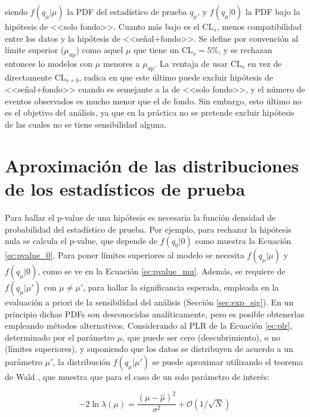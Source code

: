 \noindent
siendo $f(q_\mu|\mu)$ la PDF del estadístico de prueba $q_\mu$, y $f(q_\mu|0)$ la PDF bajo la hipótesis de <<solo fondo>>. Cuanto más bajo es el $\text{CL}_{s}$, menos compatibilidad entre los datos y la hipótesis de <<señal+fondo>>. Se define por convención al límite superior ($\mu_{\text{up}}$) como aquel $\mu$ que tiene un $\text{CL}_{s}=5\%$, y se rechazan entonces lo modelos con $\mu$ menores a $\mu_{\text{up}}$. La ventaja de usar $\text{CL}_{s}$ en vez de directamente $\text{CL}_{s+b}$, radica en que este último puede excluir hipótesis de <<señal+fondo>> cuando es semejante a la de <<solo fondo>>, y el número de eventos observados es mucho menor que el de fondo. Sin embargo, esto último no es el objetivo del análisis, ya que en la práctica no se pretende excluir hipótesis de las cuales no se tiene sensibilidad alguna. 




\section{Aproximación de las distribuciones de los estadísticos de prueba}\label{sec:aprox_test}

Para hallar el p-value de una hipótesis es necesaria la función densidad de probabilidad del estadístico de prueba. Por ejemplo, para rechazar la hipótesis nula se calcula el p-value, que depende de $f(q_{0}|0)$ como muestra la Ecuación \ref{ec:pvalue_0}. Para poner límites superiores al modelo se necesita $f(q_{\mu}|\mu)$ y $f(q_{\mu}|0)$, como se ve en la Ecuación \ref{ec:pvalue_mu}. Además, se requiere de $f(q_{\mu}|\mu')$ con $\mu\neq\mu'$, para hallar la significancia esperada, empleada en la evaluación a priori de la sensibilidad del análisis (Sección \ref{sec:exp_sig}). En un principio dichas PDFs son desconocidas analíticamente, pero es posible obtenerlas empleando métodos alternativos.
Considerando al PLR de la Ecuación \ref{ec:plr}, determinado por el parámetro $\mu$, que puede ser cero (descubrimiento), o no (límites superiores), y suponiendo que los datos se distribuyen de acuerdo a un parámetro $\mu'$, la distribución $f(q_{\mu}|\mu')$ se puede aproximar utilizando el teorema de Wald \cite{10.2307/1990256}, que muestra que para el caso de un solo parámetro de interés:

\begin{equation}
	-2\ln{\lambda(\mu)}=\frac{(\mu-\hat{\mu})^{2}}{\sigma^{2}}+\mathcal{O}(1/\sqrt{N})
\end{equation}

